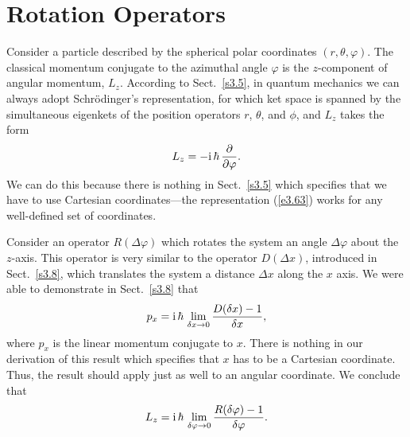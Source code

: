 \section{Rotation Operators}\label{s5.3}
Consider a particle described by the spherical polar coordinates
$(r, \theta, \varphi)$. The classical momentum conjugate to the azimuthal
angle $\varphi$ is the $z$-component of angular momentum, $L_z$. 
According to Sect.~\ref{s3.5}, in quantum mechanics we can always adopt Schr\"{o}dinger's
representation, for  which ket space is spanned by the simultaneous eigenkets
of the position operators $r$, $\theta$, and $\phi$, and $L_z$ takes the
form
\begin{equation}\label{e5.45}
L_z = -{\rm i}\,\hbar\, \frac{\partial}{\partial \varphi}.
\end{equation}
We can do this because there is nothing in Sect.~\ref{s3.5} which specifies that
we have to use  Cartesian coordinates---the representation (\ref{e3.63}) works for 
any well-defined set of coordinates. 

Consider an operator $R(\Delta\varphi)$ which rotates the system an angle
$\Delta\varphi$ about the $z$-axis. This operator is very similar to the
operator $D(\Delta x)$, introduced in Sect.~\ref{s3.8}, which translates the system
a distance $\Delta x$ along the $x$ axis. 
We were able to demonstrate in Sect.~\ref{s3.8}
that
\begin{equation}
p_x = {\rm i}\,\hbar\, \lim_{\delta x\rightarrow 0}\frac{D(\delta x)-1}
{\delta x},
\end{equation}
where $p_x$ is the linear momentum conjugate to $x$. There is nothing
in our derivation of this result which specifies that $x$ has to be a Cartesian
coordinate. Thus, the result should apply just as well to an angular
coordinate. We conclude that
\begin{equation}\label{e5.47}
L_z = {\rm i}\,\hbar\, \lim_{\delta \varphi\rightarrow 0}\frac{R(\delta \varphi)-1}
{\delta \varphi}.
\end{equation}

